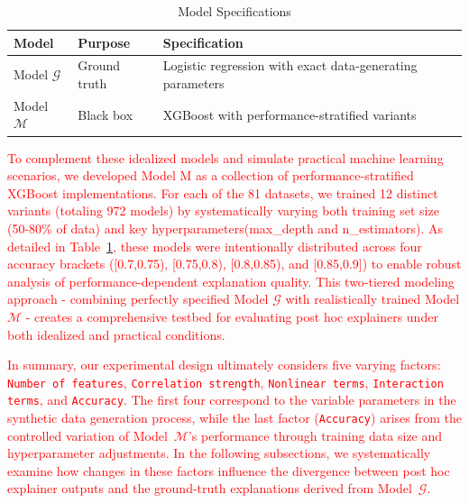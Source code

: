 \begin{table}[htbp]
\centering
\caption{Model Specifications}
\label{tab:models}
\begin{tabular}{lll}
\toprule
\textbf{Model} & \textbf{Purpose} & \textbf{Specification} \\
\midrule
Model $\mathcal{G}$ & Ground truth & Logistic regression with exact data-generating parameters \\
Model $\mathcal{M}$ & Black box & XGBoost with performance-stratified variants \\
\bottomrule
\end{tabular}
\end{table}

\textcolor{red}{To complement these idealized models and simulate practical machine learning scenarios, we developed Model M as a collection of performance-stratified XGBoost implementations. For each of the 81 datasets, we trained 12 distinct variants (totaling 972 models) by systematically varying both training set size (50-80\% of data) and key hyperparameters(max\_depth and n\_estimators). As detailed in Table~\ref{tab:models}, these models were intentionally distributed across four accuracy brackets ([0.7,0.75), [0.75,0.8), [0.8,0.85), and [0.85,0.9]) to enable robust analysis of performance-dependent explanation quality. This two-tiered modeling approach - combining perfectly specified Model $\mathcal{G}$ with realistically trained Model $\mathcal{M}$ - creates a comprehensive testbed for evaluating post hoc explainers under both idealized and practical conditions.}

\textcolor{red}{In summary, our experimental design ultimately considers five varying factors: \texttt{Number of features}, \texttt{Correlation strength}, \texttt{Nonlinear terms}, \texttt{Interaction terms}, and \texttt{Accuracy}. The first four correspond to the variable parameters in the synthetic data generation process, while the last factor (\texttt{Accuracy}) arises from the controlled variation of Model~$\mathcal{M}$'s performance through training data size and hyperparameter adjustments. In the following subsections, we systematically examine how changes in these factors influence the divergence between post hoc explainer outputs and the ground-truth explanations derived from Model~$\mathcal{G}$.}

